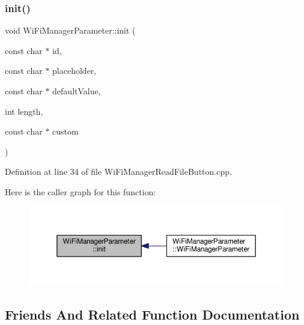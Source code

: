 \mbox{\label{class_wi_fi_manager_parameter_a137b764027d3851a428f3ab185a5660f}} 
\subsubsection{\texorpdfstring{init()}{init()}}
{\footnotesize\ttfamily void Wi\+Fi\+Manager\+Parameter\+::init (\begin{DoxyParamCaption}\item[{const char $\ast$}]{id,  }\item[{const char $\ast$}]{placeholder,  }\item[{const char $\ast$}]{default\+Value,  }\item[{int}]{length,  }\item[{const char $\ast$}]{custom }\end{DoxyParamCaption})\hspace{0.3cm}{\ttfamily [private]}}



Definition at line 34 of file Wi\+Fi\+Manager\+Read\+File\+Button.\+cpp.

Here is the caller graph for this function\+:\nopagebreak
\begin{figure}[H]
\begin{center}
\leavevmode
\includegraphics[width=350pt]{class_wi_fi_manager_parameter_a137b764027d3851a428f3ab185a5660f_icgraph}
\end{center}
\end{figure}


\subsection{Friends And Related Function Documentation}
\mbox{\label{class_wi_fi_manager_parameter_a56d1e08e3880a330575332abac06e6c8}} 
